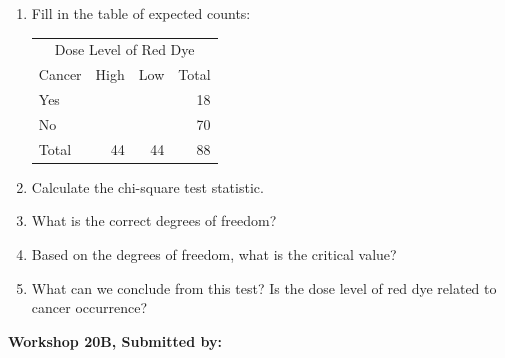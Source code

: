 \documentclass[11pt, chapterprefix=true]{scrbook}\usepackage[]{graphicx}\usepackage[]{color}
\begin{document}
\begin{exercises}
\begin{exercise}
\begin{enumerate}
  \item Fill in the table of expected counts:

\begin{center}  
\begin{tabular}{@{} l rrr @{}} \hline				
  \multicolumn{4}{c}{Dose Level of Red Dye} \\	
Cancer&	High&	Low&	Total \\ \hline
Yes&	&	&	18 \\
No&	&	&	70 \\ \hline
Total&	44&	44&	88 \\ \hline
\end{tabular}
\end{center} 

  \item	Calculate the chi-square test statistic.
  \item	What is the correct degrees of freedom?
  \item	Based on the degrees of freedom, what is the critical value?
  \item	What can we conclude from this test? Is the dose level of red dye related to cancer occurrence? 
\end{enumerate}

\end{exercise}
\begin{solution}  %

\end{solution}


\clearpage

    \begin{exercise}  %

    \begin{center}
\begin{flushleft}\textbf{\large \hfill Workshop 20B, Submitted by: }\end{flushleft}

\end{center}
\end{exercise}
\end{exercises}
\end{document}
